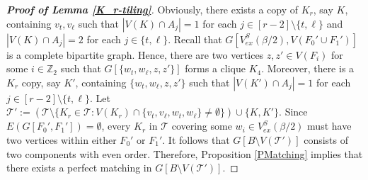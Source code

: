 \documentclass[11pt, a4paper]{article}
\theoremstyle{definition}
\newcommand{\<}{\subseteq}
\begin{document}
\begin{proof}[\bf Proof of Lemma \ref{K_r-tiling}]
Obviously, there exists a copy of $K_r$, say $K$, containing $v_t,v_{\ell}$ such that $|V(K)\cap A_j|=1$ for each $j\in [r-2]\setminus \{t,\ell\}$ and $|V(K)\cap A_j|=2$ for each $j\in \{t,\ell\}$. Recall that $G[V_{ex}^S(\beta/2),V(F_0'\cup F_1')]$ is a complete bipartite graph. Hence, there are two vertices $z,z'\in V(F_i)$ for some $i\in \mathbb{Z}_2$ such that $G[\{w_t,w_{\ell},z,z'\}]$ forms a clique $K_4$. Moreover, there is a $K_r$ copy, say $K'$, containing $\{w_t,w_{\ell},z,z'\}$ such that $|V(K')\cap A_j|=1$ for each $j\in [r-2]\setminus \{t,\ell\}$. Let $\mathcal{T}':=(\mathcal{T}\setminus \{K_r\in \mathcal{T}: V(K_r)\cap \{v_t,v_{\ell},w_t,w_{\ell}\}\ne \emptyset\})\cup\{K,K'\}$. Since $E(G[F_0',F_1'])=\emptyset$, every $K_r$ in $\mathcal{T}$ covering some $w_i \in V_{ex}^S(\beta/2)$ must have two vertices within either $F_0'$ or $F_1'$. 
It follows that  $G[B\setminus V(\mathcal{T}')]$ consists of two components with even order.  Therefore,  %
Proposition \ref{PMatching} implies that there exists a perfect matching in $G[B\setminus V(\mathcal{T}')].$





\end{proof}
\end{document}
